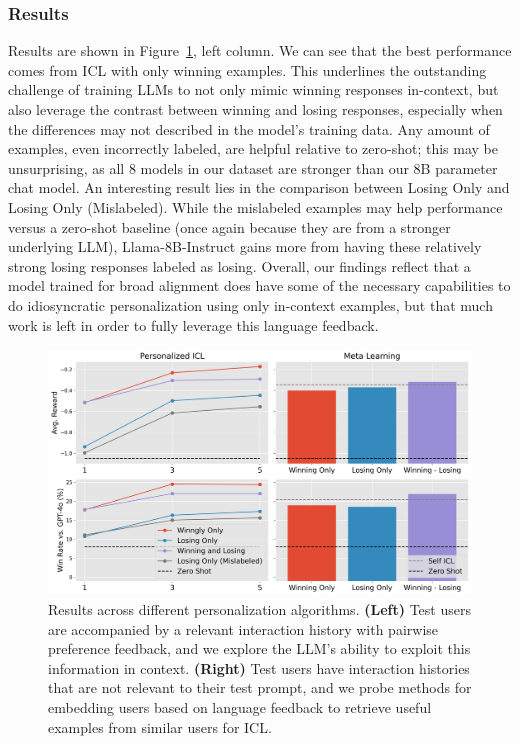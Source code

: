 \subsubsection{Results}

Results are shown in Figure~\ref{fig:exp_results}, left column.  
We can see that the best performance comes from ICL with only winning examples. 
This underlines the outstanding challenge of training LLMs to not only mimic winning responses in-context, but also leverage the contrast between winning and losing responses, especially when the differences may not described in the model's training data.
Any amount of examples, even incorrectly labeled, are helpful relative to zero-shot; this may be unsurprising, as all 8 models in our dataset are stronger than our 8B parameter chat model.
An interesting result lies in the comparison between Losing Only and Losing Only (Mislabeled).  
While the mislabeled examples may help performance versus a zero-shot baseline (once again because they are from a stronger underlying LLM), Llama-8B-Instruct gains more from having these relatively strong losing responses labeled as losing.
Overall, our findings reflect that a model trained for broad alignment does have some of the necessary capabilities to do idiosyncratic personalization using only in-context examples, but that much work is left in order to fully leverage this language feedback.


\begin{figure}[!ht]
    \centering
    \includegraphics[width=\textwidth]{figures/final_exps.png}
    \caption{Results across different personalization algorithms. 
    \textbf{(Left)} Test users are accompanied by a relevant interaction history with pairwise preference feedback, and we explore the LLM's ability to exploit this information in context. 
    \textbf{(Right)} Test users have interaction histories that are not relevant to their test prompt, and we probe methods for embedding users based on language feedback to retrieve useful examples from similar users for ICL.}
    \label{fig:exp_results}
\end{figure}


